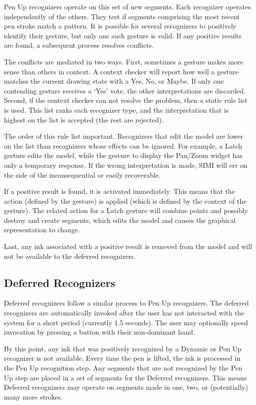 Pen Up recognizers operate on this set of new segments. Each
recognizer operates independently of the others. They test if segments
comprising the most recent pen stroke match a pattern. It is possible
for several recognizers to positively identify their gesture, but only
one such gesture is valid. If any positive results are found, a
subsequent process resolves conflicts.

The conflicts are mediated in two ways. First, sometimes a gesture
makes more sense than others in context. A context checker will report
how well a gesture matches the current drawing state with a Yes, No,
or Maybe. If only one contending gesture receives a `Yes' vote, the
other interpretations are discarded. Second, if the context checker
can not resolve the problem, then a static rule list is used. This
list ranks each recognizer type, and the interpretation that is
highest on the list is accepted (the rest are rejected).  

The order of this rule list important. Recognizers that edit the model
are lower on the list than recognizers whose effects can be
ignored. For example, a Latch gesture edits the model, while the
gesture to display the Pan/Zoom widget has only a temporary
response. If the wrong interpretation is made, SIMI will err on the
side of the inconsequential or easily recoverable.

If a positive result is found, it is activated immediately. This
means that the action (defined by the gesture) is applied (which is
defined by the context of the gesture). The related action for a Latch
gesture will combine points and possibly destroy and create segments,
which edits the model and causes the graphical representation to
change.

Last, any ink associated with a positive result is removed from the
model and will not be available to the deferred recognizers.

\subsection{Deferred Recognizers}

Deferred recognizers follow a similar process to Pen Up
recognizers. The deferred recognizers are automatically invoked after
the user has not interacted with the system for a short period
(currently 1.5 seconds). The user may optionally speed invocation by
pressing a button with their non-dominant hand.

By this point, any ink that was positively recognized by a Dynamic or
Pen Up recognizer is not available. Every time the pen is lifted, the
ink is processed in the Pen Up recognition step. Any segments that are
not recognized by the Pen Up step are placed in a set of segments for
the Deferred recognizers. This means Deferred recognizers may operate on
segments made in one, two, or (potentially) many more strokes.

